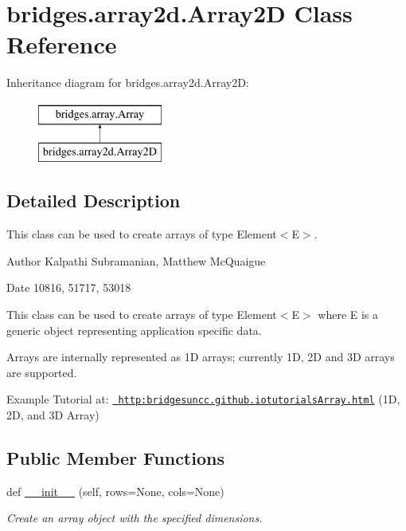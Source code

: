 \hypertarget{classbridges_1_1array2d_1_1_array2_d}{}\section{bridges.\+array2d.\+Array2D Class Reference}
\label{classbridges_1_1array2d_1_1_array2_d}
Inheritance diagram for bridges.\+array2d.\+Array2D\+:\begin{figure}[H]
\begin{center}
\leavevmode
\includegraphics[height=2.000000cm]{classbridges_1_1array2d_1_1_array2_d}
\end{center}
\end{figure}


\subsection{Detailed Description}
This class can be used to create arrays of type Element$<$\+E$>$. 

\begin{DoxyAuthor}{Author}
Kalpathi Subramanian, Matthew Mc\+Quaigue
\end{DoxyAuthor}
\begin{DoxyDate}{Date}
10816, 51717, 53018
\end{DoxyDate}
This class can be used to create arrays of type Element$<$\+E$>$ where E is a generic object representing application specific data.

Arrays are internally represented as 1D arrays; currently 1D, 2D and 3D arrays are supported.

Example Tutorial at\+: \href{http:bridgesuncc.github.iotutorialsArray.html}{\texttt{ http\+:bridgesuncc.\+github.\+iotutorials\+Array.\+html}} (1D, 2D, and 3D Array)~\newline
 \subsection*{Public Member Functions}
\begin{DoxyCompactItemize}
\item 
def \mbox{\hyperlink{classbridges_1_1array2d_1_1_array2_d_a8e55f66ed3e8b4f9dd0a6eac578d8c07}{\+\_\+\+\_\+init\+\_\+\+\_\+}} (self, rows=None, cols=None)
\begin{DoxyCompactList}\small\item\em Create an array object with the specified dimensions. \end{DoxyCompactList}\end{DoxyCompactItemize}
